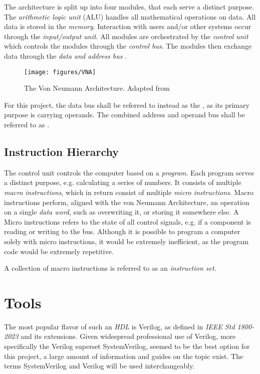 The architecture is split up into four modules, that each serve a distinct purpose. The \textit{arithmetic logic unit} (ALU) handles all mathematical operations on data. All data is stored in the \textit{memory}. Interaction with users and/or other systems occur through the \textit{input/output unit}. All modules are orchestrated by the \textit{control unit} which controls the modules through the \textit{control bus}. The modules then exchange data through the \textit{data and address bus} \cite{vonneumann1} \cite{vonneumann2}.

\begin{figure}[H]
  \begin{center}
    \texttt{[image: figures/VNA]}
  \end{center}
  \caption{The Von Neumann Architecture. Adapted from \cite{fig-vna}}\label{fig:vna}
\end{figure}

For this project, the data bus shall be referred to instead as the \cite{operand bus}, as its primary purpose is carrying operands. The combined address and operand bus shall be referred to as \cite{data bus}.

\subsection{Instruction Hierarchy}
The control unit controls the computer based on a \textit{program}. Each program serves a distinct purpose, e.g. calculating a series of numbers. It consists of multiple \textit{macro instructions}, which in return consist of multiple \textit{micro instructions}. Macro instructions perform, aligned with the von Neumann Architecture, an operation on a single \textit{data word}, such as overwriting it, or storing it somewhere else. A Micro instructions refers to the state of all control signals, e.g. if a component is reading or writing to the bus. Although it is possible to program a computer solely with micro instructions, it would be extremely inefficient, as the program code would be extremely repetitive. \cite{malvino1983a}

A collection of macro instructions is referred to as an \textit{instruction set}. 

\section{Tools} \label{sec:tools}

The most popular flavor of such an \textit{HDL} is Verilog, as defined in \textit{IEEE Std 1800-2023} \cite{10458102} and its extensions. Given widespread professional use of Verilog, more specifically the Verilog superset SystemVerilog, seemed to be the best option for this project, a large amount of information and guides on the topic exist. The terms SystemVerilog and Verilog will be used interchangeably. 

